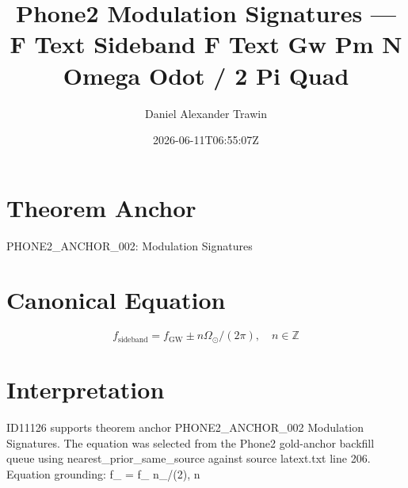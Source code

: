 \documentclass[11pt]{article}
\title{Phone2 Modulation Signatures — F Text Sideband F Text Gw Pm N Omega Odot / 2 Pi Quad}
\author{Daniel Alexander Trawin}
\date{2026-06-11T06:55:07Z}
\begin{document}
\maketitle
\section*{Theorem Anchor}
PHONE2_ANCHOR_002: Modulation Signatures
\section*{Canonical Equation}
\[
f_{\text{sideband}} = f_{\text{GW}} \pm n\Omega_{\odot}/(2\pi), \quad n \in \mathbb{Z}
\]
\section*{Interpretation}
ID11126 supports theorem anchor PHONE2_ANCHOR_002 Modulation Signatures. The equation was selected from the Phone2 gold-anchor backfill queue using nearest_prior_same_source against source latext.txt line 206. Equation grounding: f_{} = f_{} \pm n\Omega_{\odot}/(2\pi), \quad n \in {}
\end{document}
